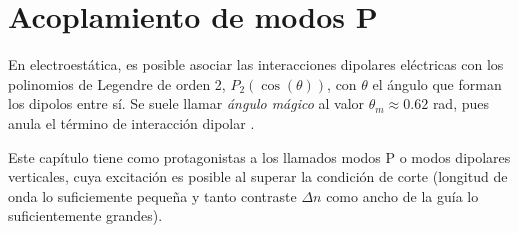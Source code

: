 \chapter{Acoplamiento de modos P}
En electroestática, es posible asociar las interacciones dipolares eléctricas con los polinomios de Legendre de orden 2, $P_2(\cos(\theta))$, con $\theta$ el ángulo que forman los dipolos entre sí. Se suele llamar \textit{ángulo mágico} al valor $\theta_m \approx 0.62$ rad, pues anula el término de interacción dipolar \citep{medmagic}. 

Este capítulo tiene como protagonistas a los llamados modos P o modos dipolares verticales, cuya excitación es posible al superar la condición de corte (longitud de onda lo suficiemente pequeña y tanto contraste $\Delta n$ como ancho de la guía lo suficientemente grandes).



